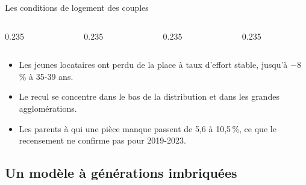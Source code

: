 \documentclass[10pt,aspectratio=169]{beamer}
\begin{document}
\begin{frame}{Les conditions de logement des couples}
  \begin{columns}[T]
    \begin{column}{0.235\textwidth}\end{column}
    \begin{column}{0.235\textwidth}\end{column}
    \begin{column}{0.235\textwidth}\end{column}
    \begin{column}{0.235\textwidth}\end{column}
  \end{columns}
  \vspace{0.3cm}
  \begin{itemize}\setlength{\itemsep}{0.35em}
    \item Les jeunes locataires ont perdu de la place à taux d'effort stable, jusqu'à $-$8\,\% à 35-39 ans.
    \item Le recul se concentre dans le bas de la distribution et dans les grandes agglomérations.
    \item Les parents à qui une pièce manque passent de 5,6 à 10,5\,\%, ce que le recensement ne confirme pas pour 2019-2023.
  \end{itemize}
\end{frame}

\subsection{Un modèle à générations imbriquées}
\end{document}
